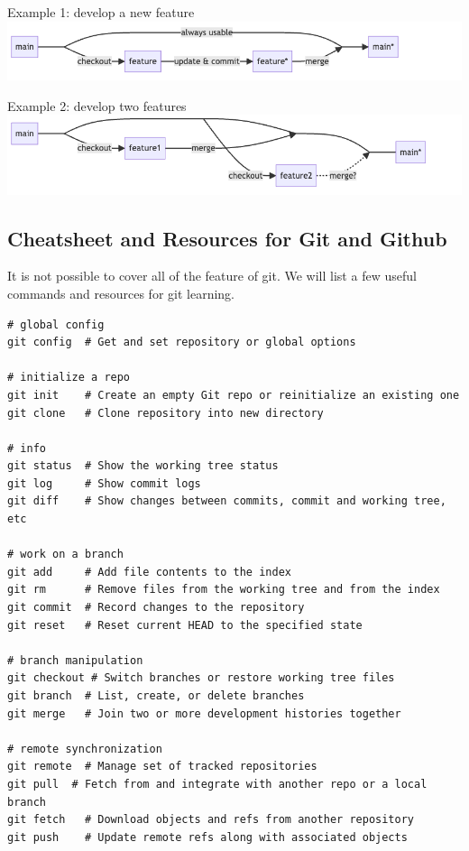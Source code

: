 \documentclass[
  notoc %
]{tufte-book}
\begin{document}
Example 1: develop a new feature
\includegraphics{./assets/images/newfeature.png}

Example 2: develop two features
\includegraphics{./assets/images/twofeatures.png}

\hypertarget{cheatsheet-and-resources-for-git-and-github}{%
\subsection{Cheatsheet and Resources for Git and
Github}\label{cheatsheet-and-resources-for-git-and-github}}

It is not possible to cover all of the feature of git. We will list a
few useful commands and resources for git learning.

\begin{lstlisting}
# global config
git config  # Get and set repository or global options

# initialize a repo
git init    # Create an empty Git repo or reinitialize an existing one
git clone   # Clone repository into new directory

# info
git status  # Show the working tree status
git log     # Show commit logs
git diff    # Show changes between commits, commit and working tree, etc

# work on a branch
git add     # Add file contents to the index
git rm      # Remove files from the working tree and from the index
git commit  # Record changes to the repository
git reset   # Reset current HEAD to the specified state

# branch manipulation
git checkout # Switch branches or restore working tree files
git branch  # List, create, or delete branches
git merge   # Join two or more development histories together

# remote synchronization
git remote  # Manage set of tracked repositories
git pull  # Fetch from and integrate with another repo or a local branch
git fetch   # Download objects and refs from another repository
git push    # Update remote refs along with associated objects
\end{lstlisting}
\end{document}
